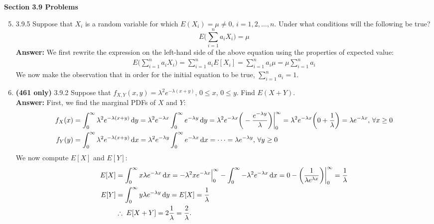 \documentclass{article}
\begin{document}
    \noindent\textbf{Section 3.9 Problems}
    \begin{enumerate}\setcounter{enumi}{4}
        \item 3.9.5 Suppose that $X_i$ is a random variable for which $E(X_i) = \mu \neq 0, \, i=1,2,\ldots ,n$. Under what conditions will the following be true?
            \[E\Bigg(\sum_{i=1}^n a_iX_i\Bigg) = \mu\]
        \textbf{Answer: }We first rewrite the expression on the left-hand side of the above equation using the properties of expected value:
            \begin{align*}
                E\Bigg(\sum_{i=1}^n a_iX_i\Bigg) = \sum_{i=1}^n a_i E[X_i] = \sum_{i=1}^n a_i\mu = \mu\sum_{i=1}^n a_i
            \end{align*}
        We now make the observation that in order for the initial equation to be true, $\sum\limits_{i=1}^n a_i = 1$.\\
        
        \item \textbf{(461 only)} 3.9.2 Suppose that $f_{X,Y} (x,y) = \lambda^2e^{-\lambda(x+y)}, \, 0 \leq x, \, 0 \leq y$. Find $E(X+Y)$.\\
        \textbf{Answer: }First, we find the marginal PDFs of $X$ and $Y$:
            \begin{align*}
                f_X(x) &= \int_0^\infty \lambda^2e^{-\lambda(x+y)} \dif y = \lambda^2e^{-\lambda x} \int_0^\infty e^{-\lambda y} \dif y = \lambda^2e^{-\lambda x}\bigg( -\frac{e^{-\lambda y}}{\lambda}\bigg)\bigg|_0^\infty = \lambda^2e^{-\lambda x}\bigg(0+\frac{1}{\lambda}\bigg) = \lambda e^{-\lambda x}, \, \forall x\geq 0\\
                f_Y(y) &= \int_0^\infty \lambda^2e^{-\lambda(x+y)} \dif x = \lambda^2e^{-\lambda y} \int_0^\infty e^{-\lambda x} \dif x = \cdots = \lambda e^{-\lambda y}, \, \forall y \geq 0
            \end{align*}
        We now compute $E[X]$ and $E[Y]$:
            \begin{align*}
                E[X] &= \int_0^\infty x\lambda e^{-\lambda x} \dif x = -\lambda^2xe^{-\lambda x}\Big|_0^\infty - \int_0^\infty -\lambda^2 e^{-\lambda x} \dif x = 0-\bigg(\frac{1}{\lambda e^{\lambda x}}\bigg)\bigg|_0^\infty = \frac{1}{\lambda}\\
                E[Y] &= \int_0^\infty y\lambda e^{-\lambda y} \dif y = E[X] = \frac{1}{\lambda}\\
                &\therefore \;E[X+Y] = 2\frac{1}{\lambda} = \frac{2}{\lambda}.
            \end{align*}
        

\end{enumerate}
\end{document}
